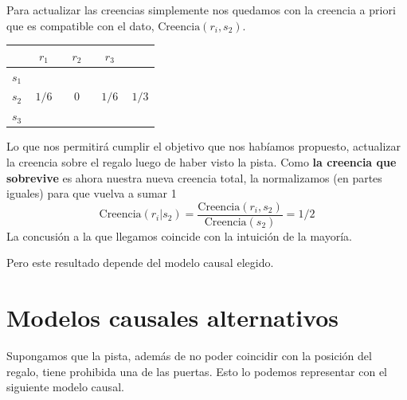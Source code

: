 \documentclass[a4paper,10pt]{book}
\theoremstyle{definition}
\begin{document}

Para actualizar las creencias simplemente nos quedamos con la creencia a priori que es compatible con el dato, $\text{Creencia}(r_i, s_2)$.
%
\begin{table}[H]
\centering
 \begin{tabular}{c|c|c|c|c} \setlength\tabcolsep{0.4cm} 
        & \, $r_1$ \, &  \, $r_2$ \, & \, $r_3$ \, & \\ \hline 
  $s_1$ &  &  & & \\ \hline
  $s_2$ & $1/6$ & $0$ & $1/6$ & $1/3$ \\ \hline
  $s_3$ &  &  &  & \\ \hline 
  \end{tabular}
\end{table}
%
Lo que nos permitirá cumplir el objetivo que nos habíamos propuesto, actualizar la creencia sobre el regalo luego de haber visto la pista.
Como \textbf{la creencia que sobrevive} es ahora nuestra nueva creencia total, la normalizamos (en partes iguales) para que vuelva a sumar 1
%
\begin{equation}
\text{Creencia}(r_i| s_2) = \frac{\text{Creencia}(r_i, s_2)}{\text{Creencia}(s_2)} = 1/2
\end{equation}
%
La concusión a la que llegamos coincide con la intuición de la mayoría.
\begin{figure}[H]
\centering
{}
\end{figure}
%
Pero este resultado depende del modelo causal elegido.

\section{Modelos causales alternativos}

Supongamos que la pista, además de no poder coincidir con la posición del regalo, tiene prohibida una de las puertas.
Esto lo podemos representar con el siguiente modelo causal.
\end{document}
